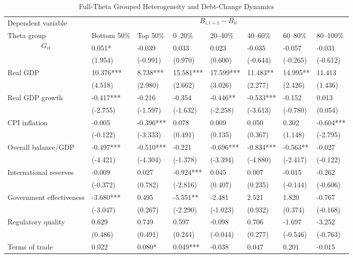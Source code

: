 \begin{table}[H]\centering
\begin{threeparttable}
\caption{Full-Theta Grouped Heterogeneity and Debt-Change Dynamics}
\label{tab:theta_group_heterogeneity_debt}
\scriptsize
\begin{tabularx}{\textwidth}{lYYYYYYY}
\toprule
Dependent variable &  \\
\cmidrule(lr){2-8}
Theta group & Bottom 50\% & Top 50\% & 0--20\% & 20--40\% & 40--60\% & 60--80\% & 80--100\% \\
\midrule
$$G_{it}$$ & 0.051* & -0.039 & 0.033 & 0.023 & -0.035 & -0.057 & -0.031 \\
  & (1.954) & (-0.991) & (0.970) & (0.600) & (-0.644) & (-0.265) & (-0.612) \\
Real GDP & 10.376*** & 8.738*** & 15.581*** & 17.599*** & 11.483** & 14.995** & 11.413 \\
  & (4.518) & (2.980) & (2.662) & (3.026) & (2.277) & (2.426) & (1.436) \\
Real GDP growth & -0.417*** & -0.216 & -0.354 & -0.446** & -0.533*** & -0.152 & 0.013 \\
  & (-2.755) & (-1.597) & (-1.632) & (-2.258) & (-3.613) & (-0.780) & (0.054) \\
CPI inflation & -0.005 & -0.396*** & 0.078 & 0.009 & 0.050 & 0.302 & -0.604*** \\
  & (-0.122) & (-3.333) & (0.491) & (0.135) & (0.367) & (1.148) & (-2.795) \\
Overall balance/GDP & -0.497*** & -0.510*** & -0.221 & -0.696*** & -0.834*** & -0.563** & -0.027 \\
  & (-4.421) & (-4.304) & (-1.378) & (-3.394) & (-4.880) & (-2.417) & (-0.122) \\
International reserves & -0.009 & 0.027 & -0.924*** & 0.045 & 0.007 & -0.015 & -0.262 \\
  & (-0.372) & (0.782) & (-2.816) & (0.407) & (0.235) & (-0.144) & (-0.606) \\
Government effectiveness & -3.680*** & 0.495 & -5.551** & -2.481 & 2.521 & 1.820 & -0.767 \\
  & (-3.047) & (0.267) & (-2.290) & (-1.023) & (0.932) & (0.374) & (-0.168) \\
Regulatory quality & 0.629 & 0.749 & 0.597 & -0.098 & 0.706 & -1.697 & -3.252 \\
  & (0.486) & (0.491) & (0.244) & (-0.044) & (0.277) & (-0.546) & (-0.763) \\
Terms of trade & 0.022 & 0.080* & 0.049*** & -0.038 & 0.047 & 0.201 & -0.015 \\

\end{tabularx}
\end{threeparttable}
\end{table}

